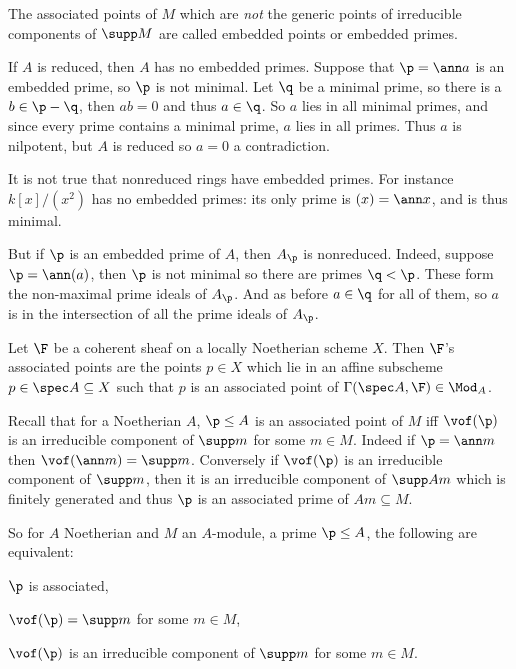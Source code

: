 \eproof

\bdefn

    The associated points of $M$ which are {\it not\/} the generic points of irreducible components of $\supp M$ are called {\emphcolor embedded points} or {\emphcolor embedded primes}.

\edefn

If $A$ is reduced, then $A$ has no embedded primes.
Suppose that $\p=\ann a$ is an embedded prime, so $\p$ is not minimal.
Let $\q$ be a minimal prime, so there is a $b\in\p-\q$, then $ab=0$ and thus $a\in\q$.
So $a$ lies in all minimal primes, and since every prime contains a minimal prime, $a$ lies in all primes.
Thus $a$ is nilpotent, but $A$ is reduced so $a=0$ a contradiction.

It is not true that nonreduced rings have embedded primes.
For instance $k[x]/(x^2)$ has no embedded primes: its only prime is $(x)=\ann x$, and is thus minimal.

But if $\p$ is an embedded prime of $A$, then $A_\p$ is nonreduced.
Indeed, suppose $\p=\ann(a)$, then $\p$ is not minimal so there are primes $\q<\p$.
These form the non-maximal prime ideals of $A_\p$.
And as before $a\in\q$ for all of them, so $a$ is in the intersection of all the prime ideals of $A_\p$.

\bdefn

    Let $\F$ be a coherent sheaf on a locally Noetherian scheme $X$.
    Then $\F$'s {\emphcolor associated points} are the points $p\in X$ which lie in an affine subscheme $p\in\spec A\subseteq X$
    such that $p$ is an associated point of $\Gamma(\spec A,\F)\in\Mod_A$.

\edefn

Recall that for a Noetherian $A$, $\p\leq A$ is an associated point of $M$ iff $\vof(\p)$ is an irreducible component of $\supp m$ for some $m\in M$.
Indeed if $\p=\ann m$ then $\vof(\ann m)=\supp m$.
Conversely if $\vof(\p)$ is an irreducible component of $\supp m$, then it is an irreducible component of $\supp Am$ which is finitely generated and thus $\p$
is an associated prime of $Am\subseteq M$.

So for $A$ Noetherian and $M$ an $A$-module, a prime $\p\leq A$, the following are equivalent:
\benum
    \item $\p$ is associated,
    \item $\vof(\p)=\supp m$ for some $m\in M$,
    \item $\vof(\p)$ is an irreducible component of $\supp m$ for some $m\in M$.
\eenum

